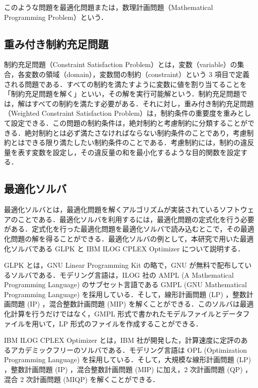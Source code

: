\documentclass[a4paper,12pt,fleqn]{jarticle}
\begin{document}
 このような問題を最適化問題または，数理計画問題（Mathematical Programming Problem）という．

\subsection{重み付き制約充足問題} \label{sec:omomi}
制約充足問題（Constraint Satisfaction Problem）とは，変数（variable）の集合，各変数の領域（domain），変数間の制約（constraint）という $3$ 項目で定義される問題である．すべての制約を満たすように変数に値を割り当てることを「制約充足問題を解く」といい，その解を実行可能解という．制約充足問題では，解はすべての制約を満たす必要がある．それに対し，重み付き制約充足問題（Weighted Constraint Satisfaction Problem）は，制約条件の重要度を重みとして設定できる\cite{CSP}．この問題の制約条件は，絶対制約と考慮制約に分類することができる．絶対制約とは必ず満たさなければならない制約条件のことであり，考慮制約とはできる限り満たしたい制約条件のことである．考慮制約には，制約の違反量を表す変数を設定し，その違反量の和を最小化するような目的関数を設定する．


\subsection{最適化ソルバ}
最適化ソルバとは，最適化問題を解くアルゴリズムが実装されているソフトウェアのことである．最適化ソルバを利用するには，最適化問題の定式化を行う必要がある．定式化を行った最適化問題を最適化ソルバで読み込むとこで，その最適化問題の解を得ることができる．最適化ソルバの例として，本研究で用いた最適化ソルバである GLPK と IBM ILOG CPLEX Optimizer について説明する．

GLPK \cite{GLPK}とは，GNU Linear Programming Kit の略で，GNU が無料で配布しているソルバである．モデリング言語は，ILOG 社の AMPL (A Mathematical Programming Language) のサブセット言語である GMPL (GNU Mathematical Programming Language) を採用している．そして，線形計画問題 (LP) ，整数計画問題 (IP) ，混合整数計画問題 (MIP) を解くことができる．このソルバは最適化計算を行うだけではなく，GMPL 形式で書かれたモデルファイルとデータファイルを用いて，LP 形式のファイルを作成することができる．

IBM ILOG CPLEX Optimizer \cite{CPLEX}とは，IBM 社が開発した，計算速度に定評のあるアカデミックフリーのソルバである．モデリング言語は OPL (Optimization Programming Language) を採用している．そして，大規模な線形計画問題 (LP) ，整数計画問題 (IP) ，混合整数計画問題 (MIP) に加え，$2$ 次計画問題 (QP) ，混合 $2$ 次計画問題 (MIQP) を解くことができる．
\end{document}
